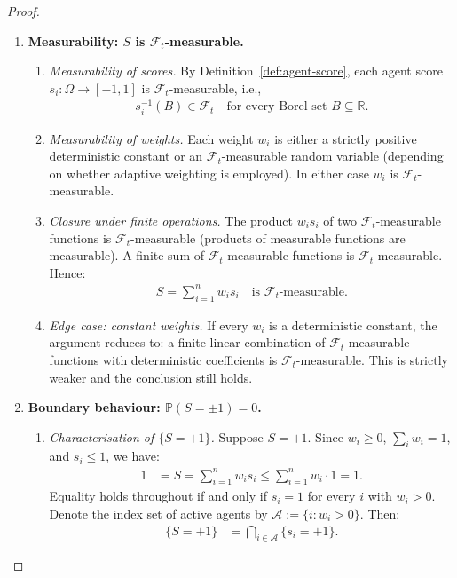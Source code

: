 \documentclass[12pt,openany]{book}
\newcommand{\calF}{\mathcal{F}}
\newcommand{\Prob}{\mathbb{P}}
\numberwithin{equation}{chapter}
\theoremstyle{plain}
\theoremstyle{definition}
\theoremstyle{remark}
\numberwithin{equation}{chapter}
\theoremstyle{plain}
\begin{document}
\begin{proof}
\begin{enumerate}
  \item \textbf{Measurability: $S$ is $\calF_t$-measurable.}

  \begin{enumerate}
    \item \emph{Measurability of scores.}
      By Definition~\ref{def:agent-score}, each agent score
      $s_i \colon \Omega \to [-1,1]$ is
      $\calF_t$-measurable, i.e.,
      \begin{align}
        s_i^{-1}(B) \in \calF_t
        \quad
        \text{for every Borel set } B \subseteq \mathbb{R}.
      \end{align}

    \item \emph{Measurability of weights.}
      Each weight $w_i$ is either a strictly positive
      deterministic constant or an $\calF_t$-measurable
      random variable (depending on whether adaptive
      weighting is employed).  In either case $w_i$ is
      $\calF_t$-measurable.

    \item \emph{Closure under finite operations.}
      The product $w_i s_i$ of two $\calF_t$-measurable
      functions is $\calF_t$-measurable (products of
      measurable functions are measurable).  A finite sum of
      $\calF_t$-measurable functions is $\calF_t$-measurable.
      Hence:
      \begin{align}
        S = \sum_{i=1}^{n} w_i s_i
        \quad
        \text{is } \calF_t\text{-measurable.}
      \end{align}

    \item \emph{Edge case: constant weights.}
      If every $w_i$ is a deterministic constant, the
      argument reduces to: a finite linear combination of
      $\calF_t$-measurable functions with deterministic
      coefficients is $\calF_t$-measurable.  This is
      strictly weaker and the conclusion still holds.
  \end{enumerate}

  \item \textbf{Boundary behaviour: $\Prob(S = \pm 1) = 0$.}

  \begin{enumerate}
    \item \emph{Characterisation of $\{S = +1\}$.}
      Suppose $S = +1$.  Since $w_i \geq 0$,
      $\sum_i w_i = 1$, and $s_i \leq 1$, we have:
      \begin{align}
        1
          &= S
           = \sum_{i=1}^{n} w_i s_i
           \leq \sum_{i=1}^{n} w_i \cdot 1
           = 1.
      \end{align}
      Equality holds throughout if and only if
      $s_i = 1$ for every $i$ with $w_i > 0$.  Denote the
      index set of active agents by
      $\mathcal{A} := \{i : w_i > 0\}$.  Then:
      \begin{align}
        \{S = +1\}
          &= \bigcap_{i \in \mathcal{A}} \{s_i = +1\}.
        \label{eq:S-plus1-event}
      \end{align}


\end{enumerate}
\end{enumerate}
\end{proof}
\end{document}

